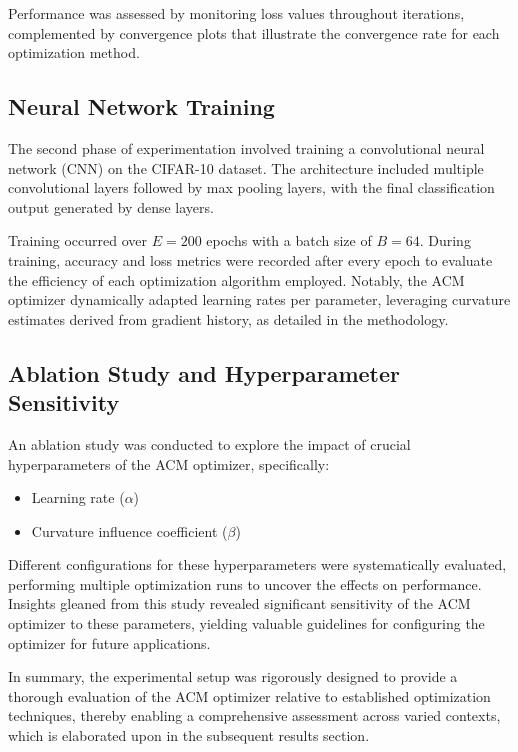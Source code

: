 \documentclass{article} %
\begin{document}
Performance was assessed by monitoring loss values throughout iterations, complemented by convergence plots that illustrate the convergence rate for each optimization method.

\subsection{Neural Network Training}

The second phase of experimentation involved training a convolutional neural network (CNN) on the CIFAR-10 dataset. The architecture included multiple convolutional layers followed by max pooling layers, with the final classification output generated by dense layers.

Training occurred over \( E = 200 \) epochs with a batch size of \( B = 64 \). During training, accuracy and loss metrics were recorded after every epoch to evaluate the efficiency of each optimization algorithm employed. Notably, the ACM optimizer dynamically adapted learning rates per parameter, leveraging curvature estimates derived from gradient history, as detailed in the methodology.

\subsection{Ablation Study and Hyperparameter Sensitivity}

An ablation study was conducted to explore the impact of crucial hyperparameters of the ACM optimizer, specifically:
\begin{itemize}
    \item Learning rate (\( \alpha \))
    \item Curvature influence coefficient (\( \beta \))
\end{itemize}

Different configurations for these hyperparameters were systematically evaluated, performing multiple optimization runs to uncover the effects on performance. Insights gleaned from this study revealed significant sensitivity of the ACM optimizer to these parameters, yielding valuable guidelines for configuring the optimizer for future applications.

In summary, the experimental setup was rigorously designed to provide a thorough evaluation of the ACM optimizer relative to established optimization techniques, thereby enabling a comprehensive assessment across varied contexts, which is elaborated upon in the subsequent results section.
\end{document}
